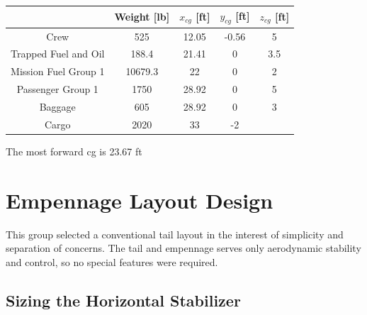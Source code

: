 \documentclass[conf]{new-aiaa}
\begin{document}
\begin{table}[H]
\centering
\label{tab:weight and cg fully loaded}
\begin{tabular}{|c|c|c|c|c|}\hline
						& Weight [lb] & $x_{cg}$ [ft] & $y_{cg}$ [ft] & $z_{cg}$ [ft]\\ \hline
Crew 					& 525 & 12.05 & -0.56 & 5\\ \hline
Trapped Fuel and Oil 	& 188.4 & 21.41 & 0 & 3.5\\ \hline
Mission Fuel Group 1 	& 10679.3 & 22 & 0 & 2\\ \hline
Passenger Group 1 		& 1750 & 28.92 & 0 & 5\\ \hline
Baggage 				& 605 & 28.92 & 0 & 3\\ \hline
Cargo 					& 2020 & 33 & -2\\ \hline

\end{tabular}

\end{table}

The most forward cg is 23.67 ft


\section{Empennage Layout Design}

This group selected a conventional tail layout in the interest of simplicity and separation of concerns. The tail and empennage serves only aerodynamic stability and control, so no special features were required.

\subsection{Sizing the Horizontal Stabilizer} %
\end{document}
